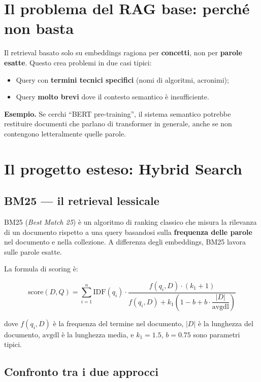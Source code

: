 \documentclass[12pt,a4paper]{article}
\begin{document}
\section{Il problema del RAG base: perch\'e non basta}

Il retrieval basato solo su embeddings ragiona per \textbf{concetti}, non per \textbf{parole esatte}. Questo crea problemi in due casi tipici:

\begin{itemize}
  \item Query con \textbf{termini tecnici specifici} (nomi di algoritmi, acronimi);
  \item Query \textbf{molto brevi} dove il contesto semantico \`e insufficiente.
\end{itemize}

\textbf{Esempio.} Se cerchi ``BERT pre-training'', il sistema semantico potrebbe restituire documenti che parlano di transformer in generale, anche se non contengono letteralmente quelle parole.

\section{Il progetto esteso: Hybrid Search}

\subsection{BM25 --- il retrieval lessicale}

BM25 (\textit{Best Match 25}) \`e un algoritmo di ranking classico che misura la rilevanza di un documento rispetto a una query basandosi sulla \textbf{frequenza delle parole} nel documento e nella collezione. A differenza degli embeddings, BM25 lavora sulle parole esatte.

La formula di scoring \`e:

\[
\text{score}(D, Q) = \sum_{i=1}^{n} \text{IDF}(q_i) \cdot \frac{f(q_i, D) \cdot (k_1 + 1)}{f(q_i, D) + k_1 \left(1 - b + b \cdot \dfrac{|D|}{\text{avgdl}}\right)}
\]

dove $f(q_i, D)$ \`e la frequenza del termine nel documento, $|D|$ \`e la lunghezza del documento, $\text{avgdl}$ \`e la lunghezza media, e $k_1 = 1.5$, $b = 0.75$ sono parametri tipici.

\subsection{Confronto tra i due approcci}
\end{document}
